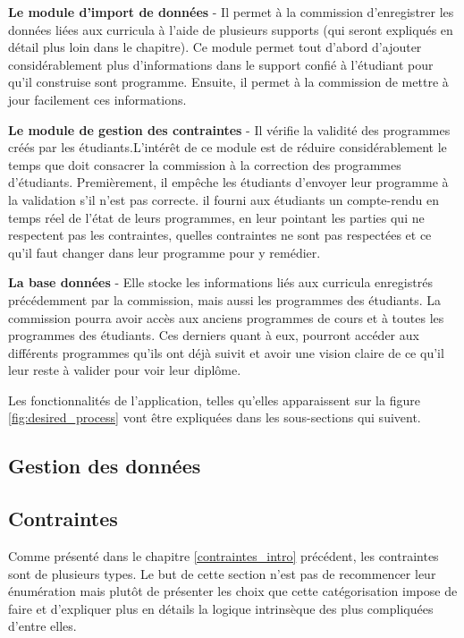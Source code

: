 \textbf{Le module d'import de données} - Il permet à la commission d'enregistrer les données liées aux curricula  à l'aide de plusieurs supports (qui seront expliqués en détail plus loin dans le chapitre). Ce module permet tout d'abord d'ajouter considérablement plus d'informations dans le support confié à l'étudiant pour qu'il construise sont programme. Ensuite, il permet à la commission de mettre à jour facilement ces informations. 
 
\textbf{Le module de gestion des contraintes} - Il vérifie la validité des programmes créés par les étudiants.L'intérêt de ce module est de réduire considérablement  le temps que doit consacrer la commission à la correction des programmes d'étudiants. Premièrement, il empêche les étudiants d'envoyer leur programme à la validation s'il n'est pas correcte. il fourni aux étudiants un compte-rendu en temps réel de l'état de leurs programmes, en leur pointant les parties qui ne respectent pas les contraintes, quelles contraintes ne sont pas respectées et ce qu'il faut changer dans leur programme pour y remédier.

\textbf{La base données} - Elle stocke les informations liés aux curricula enregistrés précédemment par la commission, mais aussi les programmes des étudiants. La commission pourra avoir accès aux anciens programmes de cours et à toutes les programmes des étudiants. Ces derniers quant à eux, pourront accéder aux différents programmes qu'ils ont déjà suivit et avoir une vision claire de ce qu'il leur reste à valider pour voir leur diplôme.

Les fonctionnalités de l'application, telles qu'elles apparaissent sur la figure \ref{fig:desired_process} vont être expliquées dans les sous-sections qui suivent.
\subsection{Gestion des données}
\label{data_mgmt}
 
\subsection{Contraintes}
\label{contraintes}
Comme présenté dans le chapitre \ref{contraintes_intro} précédent, les contraintes sont de plusieurs types. Le but de cette section n'est pas de recommencer leur énumération mais plutôt de présenter les choix que cette catégorisation impose de faire et d'expliquer plus en détails la logique intrinsèque des plus compliquées d'entre elles.    

